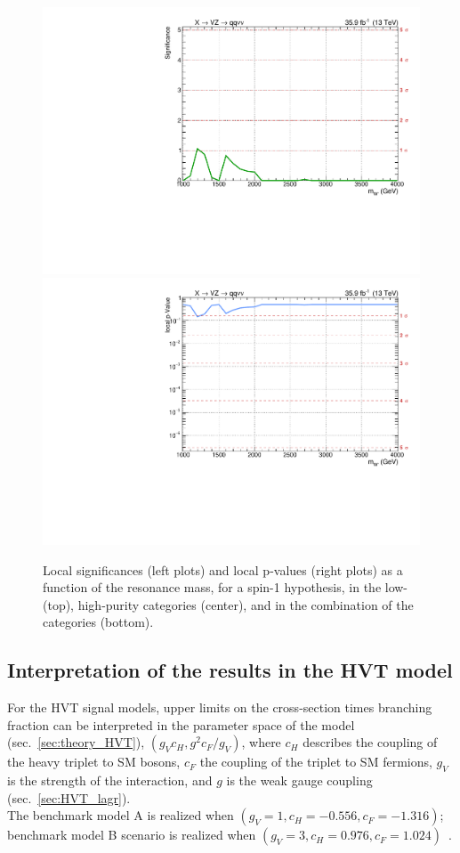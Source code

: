 \begin{figure}[!htb]
\begin{center}
     \includegraphics[width=.495\textwidth]{plotsAlpha_tesi/Limits/Significance_XWZInv_XVZnn.pdf}%
     \includegraphics[width=.495\textwidth]{plotsAlpha_tesi/Limits/pValue_XWZInv_XVZnn.pdf}
  \end{center}
  \caption{Local significances (left plots) and local p-values (right plots) as a function of the resonance mass, for a spin-1 \Wp hypothesis, in the low- (top), high-purity categories (center), and in the combination of the categories (bottom).}
  \label{fig:Signif_XWZInv}
\end{figure}


\clearpage 

\subsection{Interpretation of the results in the HVT model}

For the HVT signal models, upper limits on the cross-section times branching fraction can be interpreted in the parameter space of the model (sec.~\ref{sec:theory_HVT}), $\left( g_V c_H, g^2 c_F /g_V \right)$, where $c_H$ describes the coupling of the heavy triplet to SM bosons, $c_F$ the coupling of the triplet to SM fermions, $g_V$ is the strength of the interaction, and $g$ is the weak gauge coupling (sec.~\ref{sec:HVT_lagr}).\\
The benchmark model A is realized when $\left( g_V = 1, c_H = -0.556, c_F = -1.316 \right)$; benchmark model B scenario is realized when $\left( g_V = 3, c_H = 0.976, c_F = 1.024 \right)$~\cite{Pappadopulo2014}.

